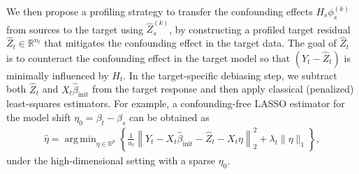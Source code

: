 \documentclass[12pt]{article}
\DeclareMathOperator*{\argmin}{arg\,min}
\begin{document}
We then propose a profiling strategy to transfer the confounding effects $H_s\phi_s^{(k)}$ from sources to the target using $\hat{Z}_s^{(k)}$, by constructing a profiled target residual $\hat{Z}_t\in \mathbb{R}^{n_t}$ that mitigates the confounding effect in the target data. The goal of $\hat{Z}_t$ is to counteract the confounding effect in the target model so that $(Y_t - \hat{Z}_t)$ is minimally influenced by $H_t$. In the target-specific debiasing step, we subtract both $\hat{Z}_t$ and $X_t\hat{\beta}_{\text{init}}$ from the target response and then apply classical (penalized) least-squares estimators. For example, a confounding-free LASSO estimator for the model shift $\eta_0 = \beta_t - \beta_s$ can be obtained as
\begin{align}
\label{eq:estimator_of_eta}
    \hat{\eta} = \argmin_{\eta \in \mathbb{R}^p }\left\{\frac{1}{n_t}\left\|Y_t - X_t \hat{\beta}_{\text{init}} - \hat{Z}_t - X_t \eta \right\|_2^2 +  \lambda_t \|\eta\|_1\right\},
\end{align}
under the high-dimensional setting with a sparse $\eta_0$. 
\end{document}
